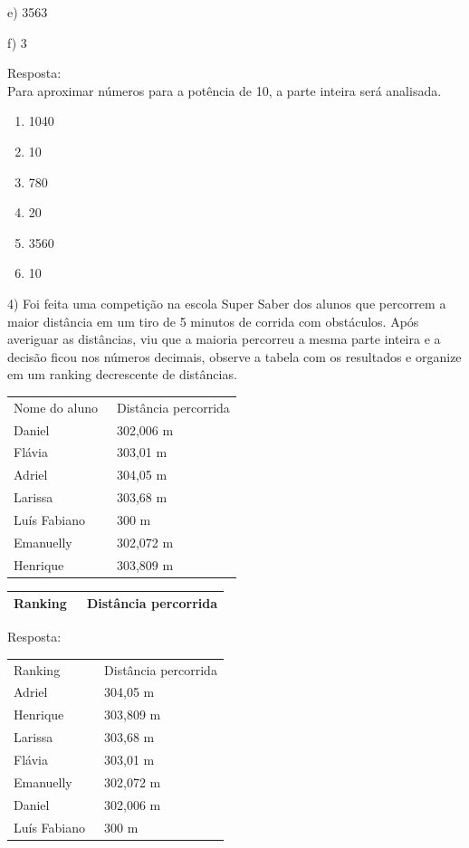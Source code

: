 e) 3563

f) 3

Resposta:\\
Para aproximar números para a potência de 10, a parte inteira será
analisada.

\begin{enumerate}
\def\labelenumi{\alph{enumi})}
\item
  1040
\item
  10
\item
  780
\item
  20
\item
  3560
\item
  10
\end{enumerate}

4) Foi feita uma competição na escola Super Saber dos alunos que
percorrem a maior distância em um tiro de 5 minutos de corrida com
obstáculos. Após averiguar as distâncias, viu que a maioria percorreu a
mesma parte inteira e a decisão ficou nos números decimais, observe a
tabela com os resultados e organize em um ranking decrescente de
distâncias.~

\begin{longtable}[]{@{}ll@{}}
\toprule
\endhead
Nome do aluno~ & Distância percorrida\tabularnewline
Daniel~ & 302,006 m\tabularnewline
Flávia~ & 303,01 m\tabularnewline
Adriel~ & 304,05 m\tabularnewline
Larissa~ & 303,68 m\tabularnewline
Luís Fabiano~ & 300 m~\tabularnewline
Emanuelly~ & 302,072 m\tabularnewline
Henrique~ & 303,809 m\tabularnewline
\bottomrule
\end{longtable}

\begin{longtable}[]{@{}ll@{}}
\toprule
\endhead
\begin{minipage}[t]{0.14\columnwidth}\raggedright
Ranking~\strut
\end{minipage} & \begin{minipage}[t]{0.30\columnwidth}\raggedright
Distância percorrida\strut
\end{minipage}\tabularnewline
\bottomrule
\end{longtable}

Resposta:

\begin{longtable}[]{@{}ll@{}}
\toprule
\endhead
Ranking~ & Distância percorrida\tabularnewline
Adriel~ & 304,05 m\tabularnewline
Henrique~ & 303,809 m\tabularnewline
Larissa~ & 303,68 m\tabularnewline
Flávia~ & 303,01 m\tabularnewline
Emanuelly~ & 302,072 m\tabularnewline
Daniel~ & 302,006 m\tabularnewline
Luís Fabiano~ & 300 m~\tabularnewline
\bottomrule
\end{longtable}

